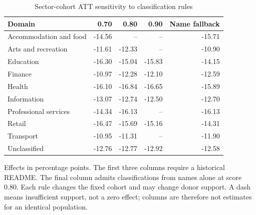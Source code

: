 \begin{table}[H]
\centering
\small
\caption{Sector-cohort ATT sensitivity to classification rules}
\label{tab:sector_sc_sensitivity}
\begin{threeparttable}
\begin{tabular}{@{}p{}rrrr@{}}
\toprule
Domain & 0.70 & 0.80 & 0.90 & Name fallback \\
\midrule
Accommodation and food & -14.56 & -- & -- & -15.71 \\
Arts and recreation & -11.61 & -12.33 & -- & -10.90 \\
Education & -16.30 & -15.04 & -15.83 & -14.15 \\
Finance & -10.97 & -12.28 & -12.10 & -12.59 \\
Health & -16.10 & -16.84 & -16.65 & -15.89 \\
Information & -13.07 & -12.74 & -12.50 & -12.70 \\
Professional services & -14.34 & -16.13 & -- & -16.13 \\
Retail & -16.47 & -15.69 & -15.16 & -14.31 \\
Transport & -10.95 & -11.31 & -- & -11.90 \\
Unclassified & -12.76 & -12.77 & -12.92 & -12.58 \\
\bottomrule
\end{tabular}
\begin{tablenotes}[flushleft]
\footnotesize
\item Effects in percentage points. The first three columns require a historical README. The final column admits classifications from names alone at score 0.80. Each rule changes the fixed cohort and may change donor support. A dash means insufficient support, not a zero effect; columns are therefore not estimates for an identical population.
\end{tablenotes}
\end{threeparttable}
\end{table}
